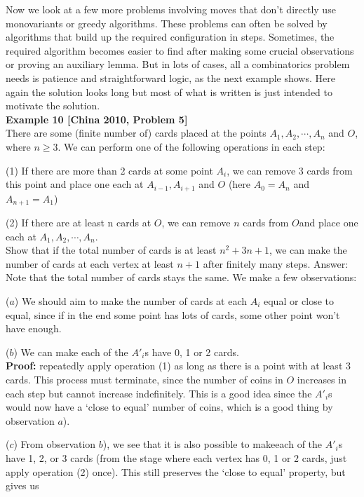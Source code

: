 \documentclass[a4paper,11pt]{book}
\begin{document}
Now we look at a few more problems involving moves that don’t
directly use monovariants or greedy algorithms. These problems
can often be solved by algorithms that build up the required
configuration in steps. Sometimes, the required algorithm
becomes easier to find after making some crucial observations or
proving an auxiliary lemma. But in lots of cases, all a
combinatorics problem needs is patience and straightforward
logic, as the next example shows. Here again the solution looks
long but most of what is written is just intended to motivate the
solution.\\

\textbf{ Example 10 [China 2010, Problem 5]}\\
There are some (finite number of) cards placed at the points $A_1,
A_2, \cdots, A_n$ and $O$, where $n \ge3$. We can perform one of the following
operations in each step:
\par\noindent (1) If there are more than 2 cards at some point $A_i$, we can remove
3 cards from this point and place one each at $A_{i-1}, A_{i+1}$ and $O$
(here $A_0 = A_n$ and $A_{n+1} = A_1$)
\par\noindent (2) If there are at least n cards at $O$, we can remove $n$ cards from $O$and place one each at $A_1, A_2, \cdots, A_n$.\\
Show that if the total number of cards is at least $n^2+3n+1$, we can
make the number of cards at each vertex at least $n + 1$ after
finitely many steps.
Answer:
Note that the total number of cards stays the same. We make a few
observations:
\par\noindent ($a$) We should aim to make the number of cards at each $A_i$ equal
or close to equal, since if in the end some point has lots of
cards, some other point won’t have enough.
\par\noindent ($b$) We can make each of the $A'_{i}$s have 0, 1 or 2 cards.\\
\textbf{ Proof:} repeatedly apply operation (1) as long as there is a
point with at least 3 cards. This process must terminate, since
the number of coins in $O$ increases in each step but cannot
increase indefinitely. This is a good idea since the $A'_{i}$s would
now have a ‘close to equal’ number of coins, which is a good
thing by observation $a$).
\par\noindent ($c$) From observation $b$), we see that it is also possible to makeeach of the $A'_{i}$s have 1, 2, or 3 cards (from the stage where
each vertex has 0, 1 or 2 cards, just apply operation (2) once).
This still preserves the ‘close to equal’ property, but gives us
\end{document}
